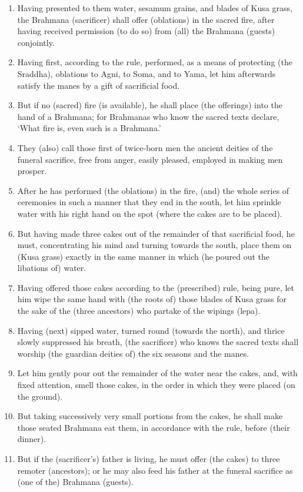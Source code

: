 \begin{enumerate}
\item Having presented to them water, sesamum grains, and blades of Kusa grass, the Brahmana (sacrificer) shall offer (oblations) in the sacred fire, after having received permission (to do so) from (all) the Brahmana (guests) conjointly.
\item Having first, according to the rule, performed, as a means of protecting (the Sraddha), oblations to Agni, to Soma, and to Yama, let him afterwards satisfy the manes by a gift of sacrificial food.
\item But if no (sacred) fire (is available), he shall place (the offerings) into the hand of a Brahmana; for Brahmanas who know the sacred texts declare, `What fire is, even such is a Brahmana.'
\item They (also) call those first of twice-born men the ancient deities of the funeral sacrifice, free from anger, easily pleased, employed in making men prosper.
\item After he has performed (the oblations) in the fire, (and) the whole series of ceremonies in such a manner that they end in the south, let him sprinkle water with his right hand on the spot (where the cakes are to be placed).
\item But having made three cakes out of the remainder of that sacrificial food, he must, concentrating his mind and turning towards the south, place them on (Kusa grass) exactly in the same manner in which (he poured out the libations of) water.
\item Having offered those cakes according to the (prescribed) rule, being pure, let him wipe the same hand with (the roots of) those blades of Kusa grass for the sake of the (three ancestors) who partake of the wipings (lepa).
\item Having (next) sipped water, turned round (towards the north), and thrice slowly suppressed his breath, (the sacrificer) who knows the sacred texts shall worship (the guardian deities of) the six seasons and the manes.
\item Let him gently pour out the remainder of the water near the cakes, and, with fixed attention, smell those cakes, in the order in which they were placed (on the ground).
\item But taking successively very small portions from the cakes, he shall make those seated Brahmana eat them, in accordance with the rule, before (their dinner).
\item But if the (sacrificer's) father is living, he must offer (the cakes) to three remoter (ancestors); or he may also feed his father at the funeral sacrifice as (one of the) Brahmana (guests).

\end{enumerate}
